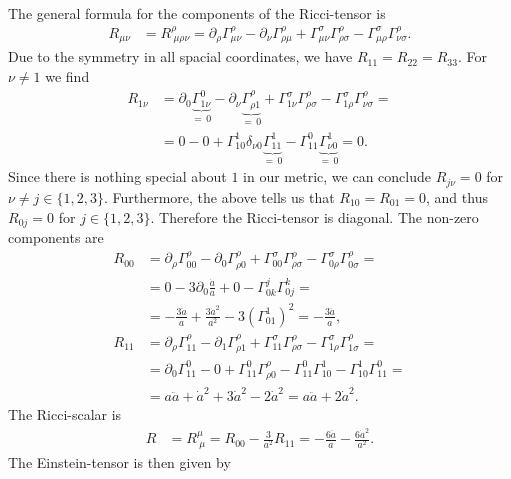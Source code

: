 \documentclass[english, parskip=full]{scrartcl}
\newcommand{\kla}{}
\begin{document}
\\
The general formula for the components of the Ricci-tensor is
\begin{align}
R_{\mu\nu} &= R^\rho_{\ \mu\rho\nu} = \partial_\rho\Gamma^\rho_{\mu\nu} - \partial_\nu \Gamma^\rho_{\rho\mu} + \Gamma^\sigma_{\mu\nu} \Gamma^\rho_{\rho\sigma} - \Gamma^\sigma_{\mu\rho} \Gamma^\rho_{\nu\sigma}.
\end{align}
Due to the symmetry in all spacial coordinates, we have $R_{11} = R_{22} = R_{33}$.
For $\nu\neq 1$ we find
\begin{align}
R_{1\nu} &= \partial_0 \underbrace{\Gamma^0_{1\nu}}_{=\,0} - \partial_\nu \underbrace{\Gamma^\rho_{\rho 1}}_{=\,0} + \Gamma^\sigma_{1\nu} \Gamma^\rho_{\rho\sigma} - \Gamma^\sigma_{1\rho} \Gamma^\rho_{\nu\sigma} = \\
&= 0 - 0 + \Gamma^1_{10}\delta_{\nu0} \underbrace{\Gamma^1_{11}}_{=\,0} - \Gamma^0_{11} \underbrace{\Gamma^1_{\nu 0}}_{=\,0} = 0.
\end{align}
Since there is nothing special about $1$ in our metric, we can conclude $R_{j\nu}=0$ for $\nu\neq j\in\{1,2,3\}$.
Furthermore, the above tells us that $R_{10} = R_{01} = 0$, and thus $R_{0j} = 0$ for $j\in\{1,2,3\}$.
Therefore the Ricci-tensor is diagonal.
The non-zero components are 
\begin{align}
R_{00} &= \partial_\rho\Gamma^\rho_{00} - \partial_0 \Gamma^\rho_{\rho 0} + \Gamma^\sigma_{00} \Gamma^\rho_{\rho\sigma} - \Gamma^\sigma_{0\rho} \Gamma^\rho_{0\sigma} = \\
&= 0 - 3\partial_0\frac{\dot{a}}{a} + 0 - \Gamma^j_{0k}\Gamma^k_{0j} = \\
&= -\frac{3\ddot{a}}{a} + \frac{3\dot{a}^2}{a^2} - 3\kla\left( \Gamma^1_{01} \right)^2 = -\frac{3\ddot{a}}{a},\\
R_{11} &= \partial_\rho\Gamma^\rho_{11} - \partial_1 \Gamma^\rho_{\rho 1} + \Gamma^\sigma_{11} \Gamma^\rho_{\rho\sigma} - \Gamma^\sigma_{1\rho} \Gamma^\rho_{1\sigma} = \\
&= \partial_0\Gamma^0_{11} - 0 + \Gamma^0_{11} \Gamma^\rho_{\rho 0} - \Gamma^0_{11}\Gamma^1_{10} - \Gamma^1_{10}\Gamma^0_{11} = \\
&= a\ddot{a} + \dot{a}^2 + 3\dot{a}^2 - 2\dot{a}^2 = a\ddot{a} + 2\dot{a}^2.
\end{align}
The Ricci-scalar is 
\begin{align}
R &= R^\mu_{\ \mu} = R_{00} - \frac{3}{a^2}R_{11} = -\frac{6\ddot{a}}{a} - \frac{6\dot{a}^2}{a^2}.
\end{align}
The Einstein-tensor is then given by
\end{document}
